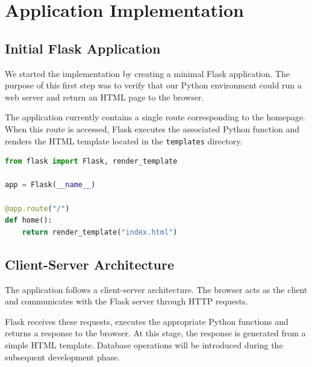 \section{Application Implementation}

\subsection{Initial Flask Application}

We started the implementation by creating a minimal
Flask application. The purpose of this first step was
to verify that our Python environment could run a web
server and return an HTML page to the browser.

The application currently contains a single route
corresponding to the homepage. When this route is
accessed, Flask executes the associated Python function
and renders the HTML template located in the
\texttt{templates} directory.

\begin{lstlisting}[language=Python,
    caption={Initial Flask application},
    label={lst:initial-flask}]
from flask import Flask, render_template

app = Flask(__name__)

@app.route("/")
def home():
    return render_template("index.html")
\end{lstlisting}

\subsection{Client-Server Architecture}

The application follows a client-server architecture.
The browser acts as the client and communicates with
the Flask server through HTTP requests.

Flask receives these requests, executes the appropriate
Python functions and returns a response to the browser.
At this stage, the response is generated from a simple
HTML template. Database operations will be introduced
during the subsequent development phase.

